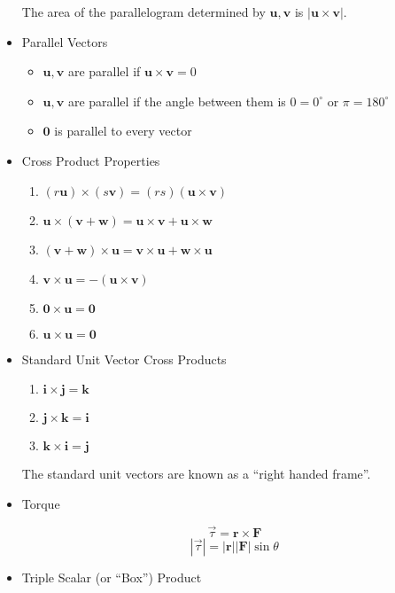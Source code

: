 \documentclass[12pt]{article}
\renewcommand{\vec}[1]{\mathbf{#1}}
\newcommand{\veci}{\mathbf{i}}
\newcommand{\vecj}{\mathbf{j}}
\newcommand{\veck}{\mathbf{k}}
\newcommand{\<}{\left<}
\renewcommand{\>}{\right>}
\begin{document}
\begin{itemize}
      The area of the parallelogram determined by $\vec{u},\vec{v}$ is $|\vec{u}\times\vec{v}|$.
    
    \item Parallel Vectors
      \begin{itemize}
      \item  $\vec{u},\vec{v}$ are parallel if $\vec{u} \times \vec{v} = 0$
      \item $\vec{u},\vec{v}$ are parallel if the angle between them is $0=0^\circ$ or $\pi = 180^\circ$
      \item $\vec{0}$ is parallel to every vector
      \end{itemize}
    
    \item Cross Product Properties
    
      \begin{enumerate}
      \item $(r\vec{u}) \times (s\vec{v}) = (rs)(\vec{u} \times \vec{v})$
      \item $\vec{u} \times (\vec{v} + \vec{w}) = \vec{u} \times \vec{v} + \vec{u} \times \vec{w}$
      \item $(\vec{v} + \vec{w}) \times \vec{u} = \vec{v} \times \vec{u} + \vec{w} \times \vec{u}$
      \item $\vec{v} \times \vec{u} = -(\vec{u} \times \vec{v})$
      \item $\vec{0} \times \vec{u} = \vec{0}$
      \item $\vec{u} \times \vec{u} = \vec{0}$
      \end{enumerate}

    \item Standard Unit Vector Cross Products
      \begin{enumerate}
      \item $\veci \times \vecj = \veck$
      \item $\vecj \times \veck = \veci$
      \item $\veck \times \veci = \vecj$
      \end{enumerate}
      The standard unit vectors are known as a ``right handed frame''.
    
    \item Torque
    
    \[\overrightarrow{\tau} = \vec{r} \times \vec{F} \]
    \[|\overrightarrow{\tau}| = |\vec{r}||\vec{F}|\sin\theta\]
    
    \item Triple Scalar (or ``Box'') Product
    

\end{itemize}
\end{document}

